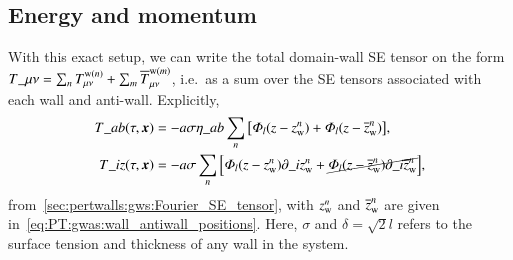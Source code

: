 \subsection{Energy and momentum}
    With this exact setup, we can write the total domain-wall SE tensor on the form %
    $T\_{\mu\nu}= \sum_{n}{T^{\mathrm{w}(n)}_{\mu\nu}} + \sum_m {\overline{T}^{\mathrm{w}(m)}_{\mu\nu}} $, 
    i.e.~as a sum over the SE tensors associated with each wall and anti-wall. Explicitly,
    \begin{equation} 
        \begin{split}
            T\_{ab}(\tau, \boldsymbol{x}) &= -a \sigma \eta\_{ab} \sum_{n} {\left[ \varPhi_{l}(z-z_\mathrm{w}^n)+ \varPhi_{l}(z-\overline{z}_\mathrm{w}^n)  \right]},  \\
            T\_{iz}(\tau, \boldsymbol{x}) &= -a \sigma \sum_{n} {\left[ \varPhi_{l}(z-z_\mathrm{w}^n) \partial\_i z_\mathrm{w}^n + \cancel{ \varPhi_{l}(z-\overline{z}_\mathrm{w}^n) \partial\_i \overline{z}_\mathrm{w}^n}  \right]},
        \end{split}
    \end{equation}
    from~\cref{sec:pertwalls:gws:Fourier_SE_tensor}, with $z_\mathrm{w}^n$ and $\overline{z}_\mathrm{w}^n$ are given in~\cref{eq:PT:gwas:wall_antiwall_positions}. Here, $\sigma$ and $\delta=\sqrt{2}l$ refers to the surface tension and thickness of any wall in the system.

